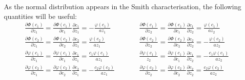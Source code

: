 \documentclass{article}
\begin{document}
As the normal distribution appears in the Smith characterisation, the
following quantities will be useful:
\begin{eqnarray}
  \label{eq:6}
  \frac{\partial \Phi(c_1)}{\partial z_1} = \frac{\partial
    \Phi(c_1)}{\partial c_1}
  \frac{\partial c_1}{\partial z_1} =  -\frac{\varphi(c_1)}{az_1} &\qquad&
  \frac{\partial \Phi(c_1)}{\partial z_2} = \frac{\partial
    \Phi(c_1)}{\partial c_1}
  \frac{\partial c_1}{\partial z_2} =  \frac{\varphi(c_1)}{az_2}\\
  \frac{\partial \Phi(c_2)}{\partial z_1} = \frac{\partial \Phi(c_2)}{\partial c_2}
  \frac{\partial c_2}{\partial z_1} =  \frac{\varphi(c_2)}{az_1} &\qquad&
  \frac{\partial \Phi(c_2)}{\partial z_2} = \frac{\partial \Phi(c_2)}{\partial c_2}
  \frac{\partial c_2}{\partial z_2} =  -\frac{\varphi(c_2)}{az_2}\\
  \frac{\partial \varphi(c_1)}{\partial z_1} = \frac{\partial \varphi(c_1)}{\partial c_1}
  \frac{\partial c_1}{\partial z_1} = \frac{c_1 \varphi(c_1)}{az_1} &\qquad& 
  \frac{\partial \varphi(c_1)}{z_2} = \frac{\partial
    \varphi(c_1)}{\partial c_1} \frac{\partial c_1}{\partial z_2} = -
  \frac{c_1 \varphi(c_1)}{a z_2}\\
  \frac{\partial \varphi(c_2)}{\partial z_1} = \frac{\partial \varphi(c_2)}{\partial c_2}
  \frac{\partial c_2}{\partial z_1} = - \frac{c_2 \varphi(c_2)}{a z_1} &\qquad&
  \frac{\partial \varphi(c_2)}{\partial z_2} = \frac{\partial \varphi(c_2)}{\partial c_2}
  \frac{\partial c_2}{\partial z_2} = \frac{c_2 \varphi(c_2)}{a z_2}
\end{eqnarray}
\end{document}
